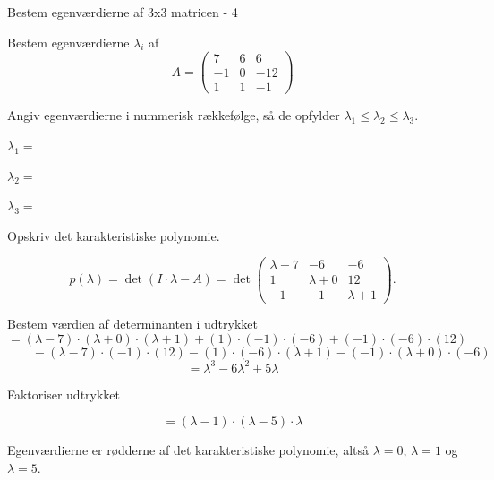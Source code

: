 \documentclass{article}
\begin{document}
\begin{exercise}{Bestem egenværdierne af 3x3 matricen - 4}

Bestem egenværdierne $\lambda_i$ af
\[
A=\begin{pmatrix}
7 & 6 & 6 \\
-1 & 0 & -12 \\
1 & 1 & -1
\end{pmatrix}
\]

Angiv egenværdierne i nummerisk rækkefølge, så de
opfylder $\lambda_1 \le \lambda_2 \le \lambda_3$.

$\lambda_1 = $ 

$\lambda_2 = $ 

$\lambda_3 = $ 

\hint
Opskriv det karakteristiske polynomie.

\hint
\[
p(\lambda)=\det\left(I \cdot \lambda - A \right)=\det\begin{pmatrix}
\lambda - 7 & -6 & -6 \\
1 & \lambda + 0 & 12 \\
-1 & -1 & \lambda + 1
\end{pmatrix}.
\]

\hint
Bestem værdien af determinanten i udtrykket
\[
=(\lambda - 7) \cdot (\lambda + 0) \cdot (\lambda + 1)+(1) \cdot (-1) \cdot (-6)+(-1) \cdot (-6) \cdot (12)
\]
\[
\qquad-(\lambda - 7) \cdot (-1) \cdot (12)-(1) \cdot (-6) \cdot (\lambda + 1)-(-1) \cdot (\lambda + 0) \cdot (-6)
\]
\[
=\lambda^3 - 6\lambda^2 + 5\lambda
\]

\hint
Faktoriser udtrykket

\hint
\[
=(\lambda - 1) \cdot (\lambda - 5) \cdot \lambda
\]

\hint
Egenværdierne er rødderne af det karakteristiske polynomie,
altså
$\lambda=0$, $\lambda=1$ og $\lambda=5$.

\end{exercise}
\end{document}
